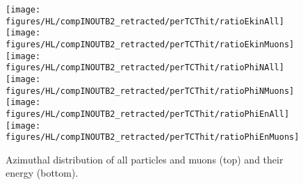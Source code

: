 \begin{figure}
\begin{center}
\texttt{[image: figures/HL/compINOUTB2\_retracted/perTCThit/ratioEkinAll]}
\texttt{[image: figures/HL/compINOUTB2\_retracted/perTCThit/ratioEkinMuons]}
\texttt{[image: figures/HL/compINOUTB2\_retracted/perTCThit/ratioPhiNAll]}
\texttt{[image: figures/HL/compINOUTB2\_retracted/perTCThit/ratioPhiNMuons]}
\texttt{[image: figures/HL/compINOUTB2\_retracted/perTCThit/ratioPhiEnAll]}
\texttt{[image: figures/HL/compINOUTB2\_retracted/perTCThit/ratioPhiEnMuons]}
\end{center}
\vspace{-0.6cm}
 \caption{Azimuthal distribution of all particles and muons (top) and their energy (bottom).
  \label{fig:compInOutB2}}
\end{figure}







